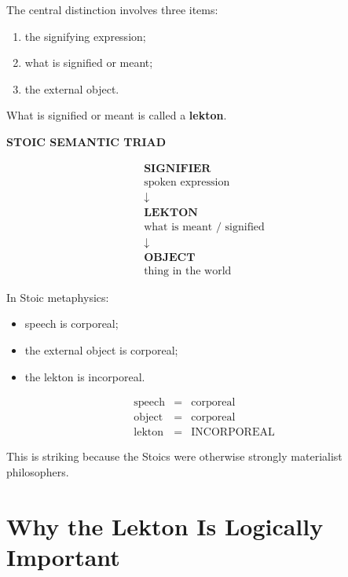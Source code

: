 \documentclass[11pt]{article}
\begin{document}
The central distinction involves three items:

\begin{enumerate}
    \item the signifying expression;
    \item what is signified or meant;
    \item the external object.
\end{enumerate}

What is signified or meant is called a \textbf{lekton}.

\begin{whiteboard}
\textbf{STOIC SEMANTIC TRIAD}

\[
\begin{array}{c}
\textbf{SIGNIFIER}\\
\text{spoken expression}\\
\downarrow\\
\textbf{LEKTON}\\
\text{what is meant / signified}\\
\downarrow\\
\textbf{OBJECT}\\
\text{thing in the world}
\end{array}
\]
\end{whiteboard}

In Stoic metaphysics:

\begin{itemize}
    \item speech is corporeal;
    \item the external object is corporeal;
    \item the lekton is incorporeal.
\end{itemize}

\begin{whiteboard}
\[
\begin{array}{rcl}
\text{speech}
&=&
\text{corporeal}
\\[0.3em]
\text{object}
&=&
\text{corporeal}
\\[0.3em]
\text{lekton}
&=&
\boxed{\text{INCORPOREAL}}
\end{array}
\]
\end{whiteboard}

This is striking because the Stoics were otherwise strongly
materialist philosophers.

\section{Why the Lekton Is Logically Important}
\end{document}
